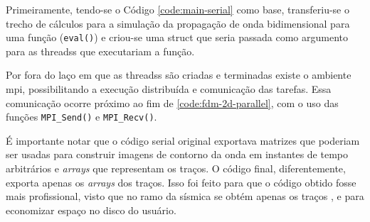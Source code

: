 Primeiramente, tendo-se o Código \ref{code:main-serial} como base, transferiu-se o trecho de cálculos para a simulação da propagação de onda bidimensional para uma função (\texttt{eval()}) e criou-se uma \gls{struct} que seria passada como argumento para as \glspl{threads} que executariam a função.

Por fora do laço em que as \glspl{threads} são criadas e terminadas existe o ambiente \acrshort{mpi}, possibilitando a execução distribuída e comunicação das tarefas. Essa comunicação ocorre próximo ao fim de \ref{code:fdm-2d-parallel}, com o uso das funções \texttt{MPI\_Send()} e \texttt{MPI\_Recv()}.
	
É importante notar que o código serial original exportava matrizes que poderiam ser usadas para construir imagens de contorno da onda em instantes de tempo arbitrários e \textit{arrays} que representam os traços. O código final, diferentemente, exporta apenas os \textit{arrays} dos traços. Isso foi feito para que o código obtido fosse mais profissional, visto que no ramo da sísmica se obtém apenas os traços \cite{notasAulas2018}, e para economizar espaço no disco do usuário.